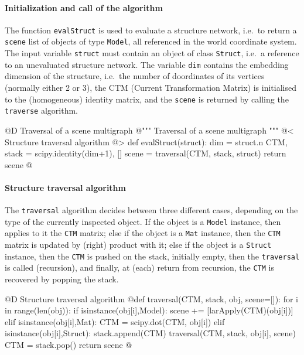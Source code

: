 \documentclass[11pt,oneside]{article}	%
\begin{document}
\paragraph{Initialization and call of the algorithm}

The function \texttt{evalStruct} is used to evaluate a structure network, i.e.~to return a \texttt{scene}
list of objects of type \texttt{Model}, all referenced in the world coordinate system. The input variable \texttt{struct} must contain an object of class \texttt{Struct}, i.e.~a reference to an unevaluated structure network. The variable \texttt{dim}  contains the embedding dimension of the structure, i.e.~the number of doordinates of its vertices (normally either 2 or 3), the CTM (Current Transformation Matrix) is initialised to the (homogeneous) identity matrix, and  the \texttt{scene} is returned by calling the \texttt{traverse} algorithm.

@D Traversal of a scene multigraph
@{""" Traversal of a scene multigraph """
@< Structure traversal algorithm @>
def evalStruct(struct):
    dim = struct.n
    CTM, stack = scipy.identity(dim+1), []
    scene = traversal(CTM, stack, struct) 
    return scene
@}

\paragraph{Structure traversal algorithm}

The \texttt{traversal} algorithm decides between three different cases, depending on the type of the currently inspected object. If the object is a \texttt{Model} instance, then applies to it the \texttt{CTM} matrix; else if the object is a \texttt{Mat} instance, then the \texttt{CTM} matrix is updated by (right) product with it; else if the object is a \texttt{Struct} instance, then the \texttt{CTM} is pushed on the stack, initially empty, then the \texttt{traversal} is called (recursion), and finally, at (each) return from recursion, the \texttt{CTM} is recovered by popping the stack.

@D Structure traversal algorithm 
@{def traversal(CTM, stack, obj, scene=[]):
    for i in range(len(obj)):
        if isinstance(obj[i],Model): 
            scene += [larApply(CTM)(obj[i])]
        elif isinstance(obj[i],Mat): 
            CTM = scipy.dot(CTM, obj[i])
        elif isinstance(obj[i],Struct):
            stack.append(CTM) 
            traversal(CTM, stack, obj[i], scene)
            CTM = stack.pop()
    return scene
@}
\end{document}
